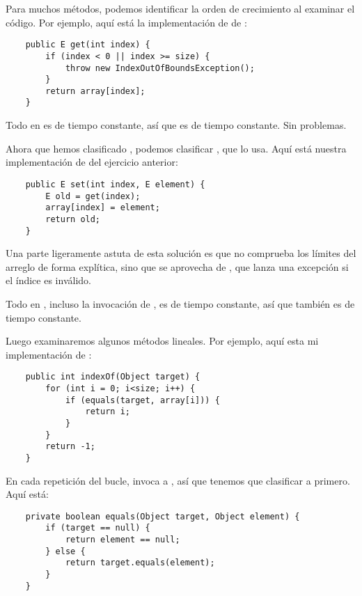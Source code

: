 \documentclass[12pt]{book}
\theoremstyle{exercise}
\begin{document}
Para muchos métodos, podemos identificar la orden de crecimiento al
examinar el código. Por ejemplo, aquí está la implementación de  de
:

\begin{verbatim}
    public E get(int index) {
        if (index < 0 || index >= size) {
            throw new IndexOutOfBoundsException();
        }
        return array[index];
    }
\end{verbatim}

Todo en  es de tiempo constante, así que  es de tiempo
constante. Sin problemas.


Ahora que hemos clasificado , podemos clasificar ,
que lo usa. Aquí está nuestra implementación de  del
ejercicio anterior:

\begin{verbatim}
    public E set(int index, E element) {
        E old = get(index);
        array[index] = element;
        return old;
    }
\end{verbatim}

Una parte ligeramente astuta de esta solución es que no comprueba los
límites del arreglo de forma explítica, sino que se aprovecha de ,
que lanza una excepción si el índice es inválido.


Todo en , incluso la invocación de , es de
tiempo constante, así que  también es de tiempo constante.


Luego examinaremos algunos métodos lineales. Por ejemplo, aquí esta mi
implementación de :

\begin{verbatim}
    public int indexOf(Object target) {
        for (int i = 0; i<size; i++) {
            if (equals(target, array[i])) {
                return i;
            }
        }
        return -1;
    }
\end{verbatim}

En cada repetición del bucle,  invoca a , así que
tenemos que clasificar a  primero. Aquí está:

\begin{verbatim}
    private boolean equals(Object target, Object element) {
        if (target == null) {
            return element == null;
        } else {
            return target.equals(element);
        }
    }
\end{verbatim}
\end{document}
